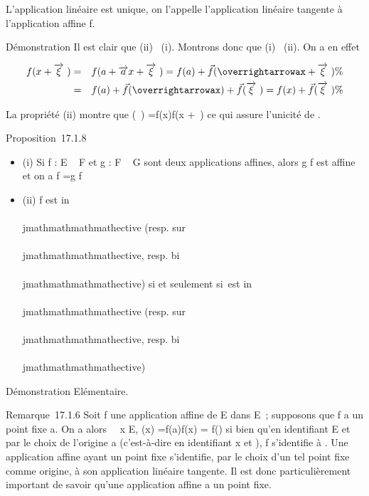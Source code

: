 L'application linéaire \vecf est unique, on l'appelle
l'application linéaire tangente à l'application affine f.

Démonstration Il est clair que (ii) \rigtharrow~(i). Montrons donc que (i) \rigtharrow~(ii).
On a en effet

\begin{align*} f(x +\overrightarrow
\xi~)& =& f(a +\overrightarrow ax
+\overrightarrow \xi~) = f(a) +\vec
f(\overrightarrowax
+\overrightarrow \xi~) \%&
\\ & =& f(a) +\vec
f(\overrightarrowax) +\vec
f(\overrightarrow\xi~) = f(x) +\vec
f(\overrightarrow\xi~)\%&
\\ \end{align*}

La propriété (ii) montre que
\vecf(\overrightarrow\xi~)
=\overrightarrow f(x)f(x
+\overrightarrow \xi~) ce qui assure l'unicité de
\vecf.

Proposition~17.1.8

\begin{itemize}
\itemsep1pt\parskip0pt
\item
  (i) Si f : E \rightarrow~ F et g : F \rightarrow~ G sont deux applications affines, alors g
  \cdot f est affine et on a \overrightarrowg \cdot f
  =\vec g \cdot\vec f
\item
  (ii) f est in\\\\jmathmathmathmathective (resp. sur\\\\jmathmathmathmathective, resp. bi\\\\jmathmathmathmathective) si et
  seulement si~\vecf est in\\\\jmathmathmathmathective (resp. sur\\\\jmathmathmathmathective,
  resp. bi\\\\jmathmathmathmathective)
\end{itemize}

Démonstration Elémentaire.

Remarque~17.1.6 Soit f une application affine de E dans E~; supposons
que f a un point fixe a. On a alors \forall~~x \in E,
\overrightarrowaf(x)
=\overrightarrow f(a)f(x) =\vec
f(\overrightarrowax) si bien qu'en identifiant E et
\overrightarrowE par le choix de l'origine a
(c'est-à-dire en identifiant x et \overrightarrowax),
f s'identifie à \vecf. Une application affine ayant
un point fixe s'identifie, par le choix d'un tel point fixe comme
origine, à son application linéaire tangente. Il est donc
particulièrement important de savoir qu'une application affine a un
point fixe.

